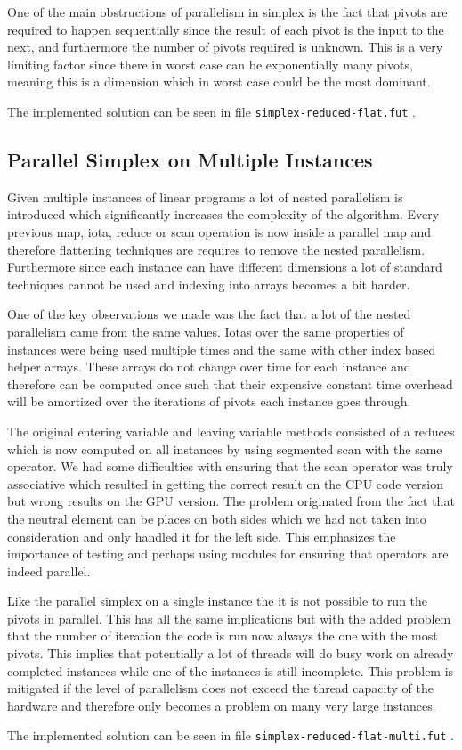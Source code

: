 One of the main obstructions of parallelism in simplex is the fact that pivots are required to happen sequentially since the result of each pivot is the input to the next, and furthermore the number of pivots required is unknown. This is a very limiting factor since there in worst case can be exponentially many pivots, meaning this is a dimension which in worst case could be the most dominant.

The implemented solution can be seen in file \texttt{simplex-reduced-flat.fut} .

\subsection{Parallel Simplex on Multiple Instances}
Given multiple instances of linear programs a lot of nested parallelism is introduced which significantly increases the complexity of the algorithm. Every previous map, iota, reduce or scan operation is now inside a parallel map and therefore flattening techniques are requires to remove the nested parallelism. Furthermore since each instance can have different dimensions a lot of standard techniques cannot be used and indexing into arrays becomes a bit harder.

One of the key observations we made was the fact that a lot of the nested parallelism came from the same values. Iotas over the same properties of instances were being used multiple times and the same with other index based helper arrays. These arrays do not change over time for each instance and therefore can be computed once such that their expensive constant time overhead will be amortized over the iterations of pivots each instance goes through.

The original entering variable and leaving variable methods consisted of a reduces which is now computed on all instances by using segmented scan with the same operator. We had some difficulties with ensuring that the scan operator was truly associative which resulted in getting the correct result on the CPU code version but wrong results on the GPU version. The problem originated from the fact that the neutral element can be places on both sides which we had not taken into consideration and only handled it for the left side. This emphasizes the importance of testing and perhaps using modules for ensuring that operators are indeed parallel.

Like the parallel simplex on a single instance the it is not possible to run the pivots in parallel. This has all the same implications but with the added problem that the number of iteration the code is run now always the one with the most pivots. This implies that potentially a lot of threads will do busy work on already completed instances while one of the instances is still incomplete. This problem is mitigated if the level of parallelism does not exceed the thread capacity of the hardware and therefore only becomes a problem on many very large instances.

The implemented solution can be seen in file \texttt{simplex-reduced-flat-multi.fut} .